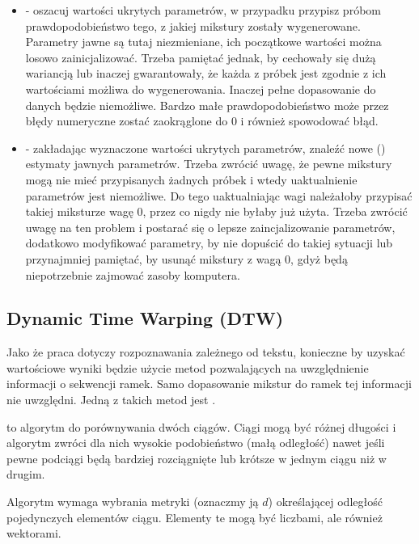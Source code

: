 \begin{itemize}
    \item {} - oszacuj wartości ukrytych parametrów, w przypadku  przypisz próbom
        prawdopodobieństwo tego, z jakiej mikstury zostały wygenerowane. Parametry jawne są tutaj niezmieniane,
        ich początkowe wartości można losowo zainicjalizować. Trzeba pamiętać jednak, by cechowały się dużą wariancją
        lub inaczej gwarantowały, że każda z próbek jest zgodnie z ich wartościami możliwa do wygenerowania. Inaczej
        pełne dopasowanie do danych będzie niemożliwe. Bardzo małe prawdopodobieństwo może przez błędy numeryczne
        zostać zaokrąglone do $0$ i również spowodować błąd.
    \item {} - zakładając wyznaczone wartości ukrytych parametrów, znaleźć nowe 
        () estymaty
        jawnych parametrów. Trzeba zwrócić uwagę, że pewne mikstury mogą nie mieć przypisanych żadnych próbek
        i wtedy uaktualnienie parametrów jest niemożliwe. Do tego uaktualniając wagi  należałoby
        przypisać takiej miksturze wagę $0$, przez co nigdy nie byłaby już użyta. Trzeba zwrócić uwagę na ten problem
        i postarać się o lepsze zaincjalizowanie parametrów, dodatkowo modyfikować parametry, by nie dopuścić
        do takiej sytuacji lub przynajmniej pamiętać, by usunąć mikstury z wagą $0$, gdyż będą niepotrzebnie zajmować
        zasoby komputera.
\end{itemize}

\subsection{Dynamic Time Warping (DTW)\cite{ADynamicProgrammingApproach}}\label{sec:dtw}

Jako że praca dotyczy rozpoznawania zależnego od tekstu, konieczne by uzyskać wartościowe wyniki będzie
użycie metod pozwalających na uwzględnienie informacji o sekwencji ramek. Samo dopasowanie mikstur do ramek
tej informacji nie uwzględni. Jedną z takich metod jest .

 to algorytm do porównywania dwóch ciągów. Ciągi mogą być różnej długości i algorytm zwróci
dla nich wysokie podobieństwo (małą odległość) nawet jeśli pewne podciągi będą bardziej rozciągnięte lub krótsze
w jednym ciągu niż w drugim.

Algorytm wymaga wybrania metryki (oznaczmy ją $d$) określającej odległość pojedynczych elementów ciągu.
Elementy te mogą być liczbami, ale również wektorami.

